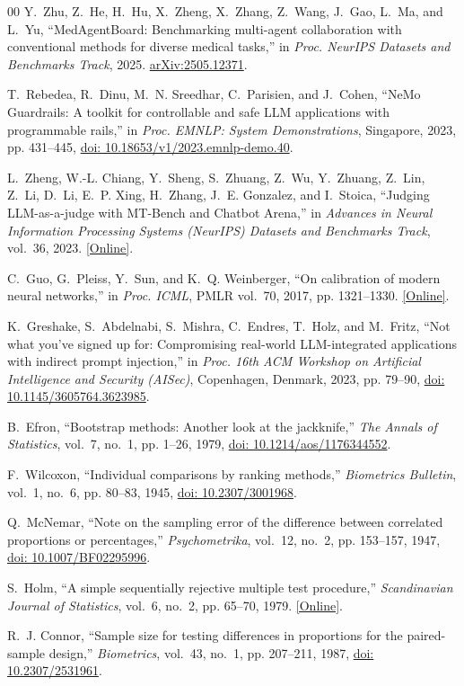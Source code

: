\documentclass[conference]{IEEEtran}
\begin{document}
\begin{thebibliography}{00}
Y.~Zhu, Z.~He, H.~Hu, X.~Zheng, X.~Zhang, Z.~Wang, J.~Gao, L.~Ma, and L.~Yu, ``MedAgentBoard: Benchmarking multi-agent collaboration with conventional methods for diverse medical tasks,'' in \emph{Proc. NeurIPS Datasets and Benchmarks Track}, 2025. \href{https://arxiv.org/abs/2505.12371}{arXiv:2505.12371}.

T.~Rebedea, R.~Dinu, M.~N. Sreedhar, C.~Parisien, and J.~Cohen, ``NeMo Guardrails: A toolkit for controllable and safe LLM applications with programmable rails,'' in \emph{Proc. EMNLP: System Demonstrations}, Singapore, 2023, pp. 431--445, \href{https://doi.org/10.18653/v1/2023.emnlp-demo.40}{doi: 10.18653/v1/2023.emnlp-demo.40}.

L.~Zheng, W.-L. Chiang, Y.~Sheng, S.~Zhuang, Z.~Wu, Y.~Zhuang, Z.~Lin, Z.~Li, D.~Li, E.~P. Xing, H.~Zhang, J.~E. Gonzalez, and I.~Stoica, ``Judging LLM-as-a-judge with MT-Bench and Chatbot Arena,'' in \emph{Advances in Neural Information Processing Systems (NeurIPS) Datasets and Benchmarks Track}, vol.~36, 2023. \href{https://arxiv.org/abs/2306.05685}{[Online]}.

C.~Guo, G.~Pleiss, Y.~Sun, and K.~Q. Weinberger, ``On calibration of modern neural networks,'' in \emph{Proc. ICML}, PMLR vol.~70, 2017, pp. 1321--1330. \href{https://arxiv.org/abs/1706.04599}{[Online]}.

K.~Greshake, S.~Abdelnabi, S.~Mishra, C.~Endres, T.~Holz, and M.~Fritz, ``Not what you've signed up for: Compromising real-world LLM-integrated applications with indirect prompt injection,'' in \emph{Proc. 16th ACM Workshop on Artificial Intelligence and Security (AISec)}, Copenhagen, Denmark, 2023, pp. 79--90, \href{https://doi.org/10.1145/3605764.3623985}{doi: 10.1145/3605764.3623985}.

B.~Efron, ``Bootstrap methods: Another look at the jackknife,'' \emph{The Annals of Statistics}, vol.~7, no.~1, pp. 1--26, 1979, \href{https://doi.org/10.1214/aos/1176344552}{doi: 10.1214/aos/1176344552}.

F.~Wilcoxon, ``Individual comparisons by ranking methods,'' \emph{Biometrics Bulletin}, vol.~1, no.~6, pp. 80--83, 1945, \href{https://doi.org/10.2307/3001968}{doi: 10.2307/3001968}.

Q.~McNemar, ``Note on the sampling error of the difference between correlated proportions or percentages,'' \emph{Psychometrika}, vol.~12, no.~2, pp. 153--157, 1947, \href{https://doi.org/10.1007/BF02295996}{doi: 10.1007/BF02295996}.

S.~Holm, ``A simple sequentially rejective multiple test procedure,'' \emph{Scandinavian Journal of Statistics}, vol.~6, no.~2, pp. 65--70, 1979. \href{https://www.jstor.org/stable/4615733}{[Online]}.

R.~J. Connor, ``Sample size for testing differences in proportions for the paired-sample design,'' \emph{Biometrics}, vol.~43, no.~1, pp. 207--211, 1987, \href{https://doi.org/10.2307/2531961}{doi: 10.2307/2531961}.
\end{thebibliography}
\end{document}
